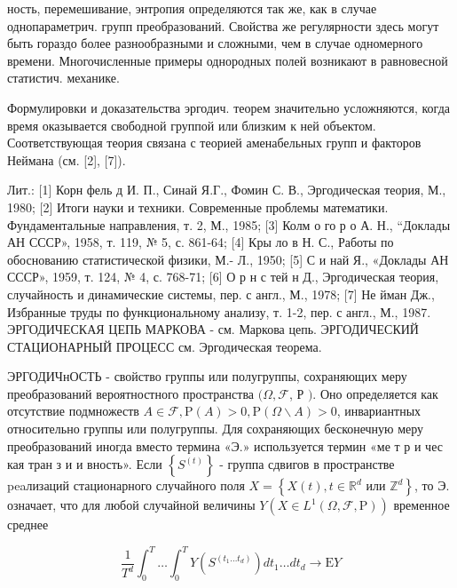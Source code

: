 \documentclass[10pt]{article}
\begin{document}
ность, перемешивание, энтропия определяются так же, как в случае однопараметрич. групп преобразований. Свойства же регулярности здесь могут быть гораздо более разнообразными и сложными, чем в случае одномерного времени. Многочисленные примеры однородных полей возникают в равновесной статистич. механике.



Формулировки и доказательства эргодич. теорем значительно усложняются, когда время оказывается свободной группой или близким к ней объектом. Соответствующая теория связана с теорией аменабельных групп и факторов Неймана (см. [2], [7]).



Лит.: [1] Корн фель д И. П., Синай Я.Г., Фомин С. В., Эргодическая теория, М., 1980; [2] Итоги науки и техники. Современные проблемы математики. Фундаментальные направления, т. 2, М., 1985; [3] Колм о го р о А. Н., “Доклады АН СССР», 1958, т. 119, № 5, с. 861-64; [4] Кры ло в Н. С., Работы по обоснованию статистической физики, М.- Л., 1950; [5] С и най Я., «Доклады АН СССР», 1959, т. 124, № 4, с. 768-71; [6] О р н с тей н Д., Эргодическая теория, случайность и динамические системы, пер. с англ., М., 1978; [7] Не йман Дж., Избранные труды по функциональному анализу, т. 1-2, пер. с англ., М., 1987. ЭРГОДИЧЕСКАЯ ЦЕПЬ МАРКОВА - см. Маркова цепь. ЭРГОДИЧЕСКИЙ СТАЦИОНАРНЫЙ ПРОЦЕСС см. Эргодическая теорема.



ЭРГОДИЧнОСТЬ - свойство группы или полугруппы, сохраняющих меру преобразований вероятностного пространства $(\Omega, \mathscr{F}$, Р $)$. Оно определяется как отсутствие подмножеств $A \in \mathscr{F}, \mathrm{P}(A)>0, \mathrm{P}(\Omega \backslash A)>0$, инвариантных относительно группы или полугруппы. Для сохраняющих бесконечную меру преобразований иногда вместо термина «Э.» используется термин «ме т р и чес кая тран з и и вность». Если $\left\{S^{(t)}\right\}$ - группа сдвигов в пространстве peaлизаций стационарного случайного поля $X=\left\{X(t), t \in \mathbb{R}^{d}\right.$ или $\left.\mathbb{Z}^{d}\right\}$, то Э. означает, что для любой случайной величины $Y\left(X \in L^{1}(\Omega, \mathscr{F}, \mathrm{P})\right)$ временное среднее



\[

\frac{1}{T^{d}} \int_{0}^{T} \ldots \int_{0}^{T} Y\left(S^{\left(t_{1} \ldots t_{d}\right)}\right) d t_{1} \ldots d t_{d} \rightarrow \mathrm{E} Y

\]
\end{document}
